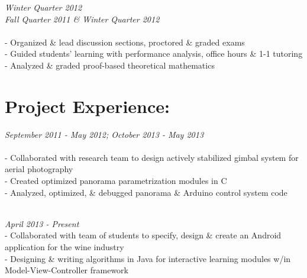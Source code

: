 \documentclass{article}
\begin{document}
\begin{spacing}{1.0}
 \hfill{\sl Winter Quarter 2012}\\
 \hfill  {\sl Fall Quarter 2011 \& Winter Quarter 2012} \\
 \\
\indent \indent - Organized \& lead discussion sections, proctored \& graded exams \\
\indent \indent - Guided students' learning with performance analysis, office hours \& 1-1 tutoring \\ 
\indent \indent - Analyzed \& graded proof-based theoretical mathematics
\end{spacing}
\hfill

\section*{Project Experience:}
\dotfill
\begin{spacing}{1.0}
 \hfill {\sl September 2011 - May 2012; October 2013 - May 2013} \\
 \\
\indent \indent -  Collaborated with research team to design actively stabilized gimbal system for aerial photography\\
\indent \indent - Created optimized panorama parametrization modules in C \\
\indent \indent - Analyzed, optimized, \& debugged panorama \& Arduino control system code
\end{spacing}
\dotfill

\begin{spacing}{1.0}
 \\
 \hfill {\sl April 2013 - Present} \\
\indent \indent - Collaborated with team of students to specify, design \& create an Android application for the wine industry\\
\indent \indent - Designing \& writing algorithms in Java for interactive learning modules w/in Model-View-Controller framework
\end{spacing}

\end{document}
